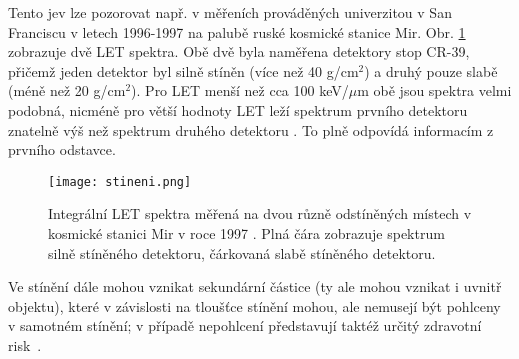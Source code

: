 Tento jev lze pozorovat např. v měřeních prováděných univerzitou v San Franciscu v letech 1996-1997 na palubě ruské kosmické stanice Mir. Obr. \ref{fig:stineni} zobrazuje dvě LET spektra. Obě dvě byla naměřena detektory stop CR-39, přičemž jeden detektor byl silně stíněn (více než 40 g/cm$^2$) a druhý pouze slabě (méně než 20 g/cm$^2$). Pro LET menší než cca 100 keV/$\mu$m obě jsou spektra velmi podobná, nicméně pro větší hodnoty LET leží spektrum prvního detektoru znatelně výš než spektrum druhého detektoru \cite{benton}. To plně odpovídá informacím z prvního odstavce.
\begin{figure}[H]
  \centering
  \texttt{[image: stineni.png]}
  \caption{Integrální LET spektra měřená na dvou různě odstíněných místech v kosmické stanici Mir v roce 1997 \cite{benton}. Plná čára zobrazuje spektrum silně stíněného detektoru, čárkovaná slabě stíněného detektoru.}
  \label{fig:stineni}
\end{figure}

Ve stínění dále mohou vznikat sekundární částice (ty ale mohou vznikat i uvnitř objektu), které v závislosti na tloušťce stínění mohou, ale nemusejí být pohlceny v samotném stínění; v případě nepohlcení představují taktéž určitý zdravotní risk~\cite{benton}. 


